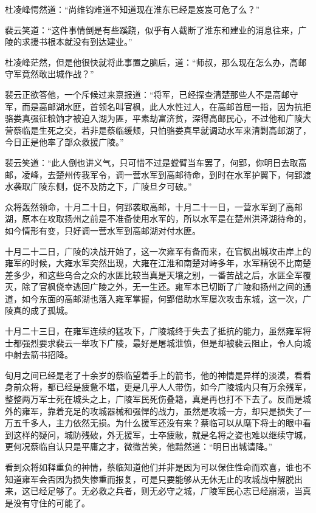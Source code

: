 杜凌峰愕然道：“尚维钧难道不知道现在淮东已经是岌岌可危了么？”

裴云笑道：“这件事情倒是有些蹊跷，似乎有人截断了淮东和建业的消息往来，广陵的求援书根本就没有到达建业。”

杜凌峰茫然，但是他很快就将此事置之脑后，道：“师叔，那么现在怎么办，高邮守军竟然敢出城作战？”

裴云正欲答他，一个斥候过来禀报道：“将军，已经探查清楚那些人不是高邮守军，而是高邮湖水匪，首领名叫官枫，此人水性过人，在高邮首屈一指，因为抗拒骆娄真强征粮饷才被迫入湖为匪，平素劫富济贫，深得高邮民心，不过他和广陵大营蔡临是生死之交，若非是蔡临缓颊，只怕骆娄真早就调动水军来清剿高邮湖了，今日正是他率了部众救援广陵。”

裴云笑道：“此人倒也讲义气，只可惜不过是螳臂当车罢了，何郢，你明日去取高邮，凌峰，去楚州传我军令，调一营水军到高邮待命，到时在水军护翼下，何郢渡水袭取广陵东侧，促不及防之下，广陵旦夕可破。”

众将轰然领命，十月二十日，何郢袭取高邮，十月二十一日，一营水军到了高邮湖，原本在攻取扬州之前是不准备使用水军的，所以水军是在楚州洪泽湖待命的，如今情形有变，只好调一营水军到高邮湖对付水匪。

十月二十二日，广陵的决战开始了，这一次雍军有备而来，在官枫出城攻击岸上的雍军的时候，大雍水军突然出现，大雍在江淮和南楚对峙多年，水军精锐不比南楚差多少，和这些乌合之众的水匪比较当真是天壤之别，一番苦战之后，水匪全军覆灭，除了官枫侥幸逃回广陵之外，无一生还。雍军本已切断了广陵和扬州之间的通道，如今东面的高邮湖也落入雍军掌握，何郢借助水军屡次攻击东城，这一次，广陵真的成了孤城。

十月二十三日，在雍军连续的猛攻下，广陵城终于失去了抵抗的能力，虽然雍军将士都强烈要求裴云一举攻下广陵，最好是屠城泄愤，但是却被裴云阻止，令人向城中射去箭书招降。

旬月之间已经是老了十余岁的蔡临望着手上的箭书，他的神情是异样的淡漠，看看身前众将，都已经是疲惫不堪，更是几乎人人带伤，如今广陵城内只有万余残军，整整两万军士死在城头之上，广陵军民死伤叠籍，真是再也打不下去了。反而是城外的雍军，靠着充足的攻城器械和强悍的战力，虽然是攻城一方，却只是损失了一万五千多人，主力依然无损。为什么援军还没有来？蔡临可以从麾下将士的眼中看到这样的疑问，城防残破，外无援军，士卒疲敝，就是名将之姿也难以继续守城，更何况蔡临自认只是平庸之才，微微苦笑，他黯然道：“明日出城请降。”

看到众将如释重负的神情，蔡临知道他们并非是因为可以保住性命而欢喜，谁也不知道雍军会否因为损失惨重而报复，可是只要能够从无休无止的攻城战中解脱出来，这已经足够了。无必救之兵者，则无必守之城，广陵军民心志已经崩溃，当真是没有守住的可能了。

